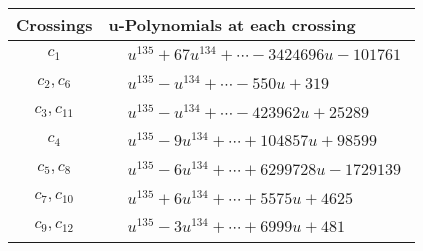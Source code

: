 \documentclass[1p]{elsarticle_modified}
\theoremstyle{definition}
\begin{document}
\begin{tabular}{m{50pt}|m{274pt}}
Crossings & \hspace{64pt}u-Polynomials at each crossing \\
\hline $$\begin{aligned}c_{1}\end{aligned}$$&$\begin{aligned}
&u^{135}+67 u^{134}+\cdots-3424696 u-101761
\end{aligned}$\\
\hline $$\begin{aligned}c_{2},c_{6}\end{aligned}$$&$\begin{aligned}
&u^{135}- u^{134}+\cdots-550 u+319
\end{aligned}$\\
\hline $$\begin{aligned}c_{3},c_{11}\end{aligned}$$&$\begin{aligned}
&u^{135}- u^{134}+\cdots-423962 u+25289
\end{aligned}$\\
\hline $$\begin{aligned}c_{4}\end{aligned}$$&$\begin{aligned}
&u^{135}-9 u^{134}+\cdots+104857 u+98599
\end{aligned}$\\
\hline $$\begin{aligned}c_{5},c_{8}\end{aligned}$$&$\begin{aligned}
&u^{135}-6 u^{134}+\cdots+6299728 u-1729139
\end{aligned}$\\
\hline $$\begin{aligned}c_{7},c_{10}\end{aligned}$$&$\begin{aligned}
&u^{135}+6 u^{134}+\cdots+5575 u+4625
\end{aligned}$\\
\hline $$\begin{aligned}c_{9},c_{12}\end{aligned}$$&$\begin{aligned}
&u^{135}-3 u^{134}+\cdots+6999 u+481
\end{aligned}$\\
\hline
\end{tabular}\\~\\
\end{document}
